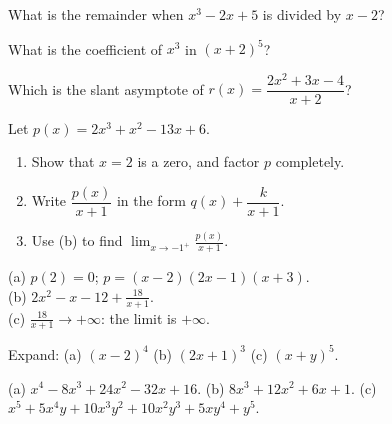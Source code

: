\begin{exo}{}
What is the remainder when $x^3-2x+5$ is divided by $x-2$?
\end{exo}
\begin{exo}{}
What is the coefficient of $x^3$ in $(x+2)^5$?
\end{exo}
\begin{exo}{}
Which is the slant asymptote of $r(x)=\dfrac{2x^2+3x-4}{x+2}$?
\end{exo}
\begin{exo}{}
Let $p(x)=2x^3+x^2-13x+6$.
\begin{enumerate}[label=(\alph*)]
\item Show that $x=2$ is a zero, and factor $p$ completely.
\item Write $\dfrac{p(x)}{x+1}$ in the form $q(x)+\dfrac{k}{x+1}$.
\item Use (b) to find $\displaystyle\lim_{x\to-1^+}\frac{p(x)}{x+1}$.
\end{enumerate}
\begin{solution}
(a) $p(2)=0$; $p=(x-2)(2x-1)(x+3)$.\\
(b) $2x^2-x-12+\frac{18}{x+1}$.\\
(c) $\frac{18}{x+1}\to+\infty$: the limit is $+\infty$.
\end{solution}
\end{exo}
\begin{exo}{}
Expand: (a) $(x-2)^4$ \quad (b) $(2x+1)^3$ \quad (c) $(x+y)^5$.
\begin{solution}
(a) $x^4-8x^3+24x^2-32x+16$. (b) $8x^3+12x^2+6x+1$. (c) $x^5+5x^4y+10x^3y^2+10x^2y^3+5xy^4+y^5$.
\end{solution}
\end{exo}

